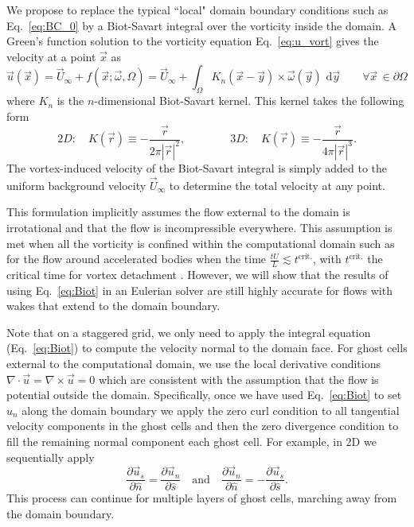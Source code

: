 \documentclass[11pt]{article}
\begin{document}
We propose to replace the typical ``local" domain boundary conditions such as Eq.~\ref{eq:BC_0} by a Biot-Savart integral over the vorticity inside the domain. A Green's function solution to the vorticity equation Eq.~\ref{eq:u_vort} gives the velocity at a point $\vec x$ as
\begin{equation}\label{eq:Biot}
    {\vec u}({\vec x}) = \vec U_\infty+f(\vec x; \vec\omega,\Omega) = \vec U_\infty+\int_\Omega K_{n}({\vec x} - \vec{y})\times \vec\omega({\vec y})\text{ d}\vec{y} \quad\quad \forall \vec x\, \in \partial\Omega
\end{equation}
where $K_n$ is the $n$-dimensional Biot-Savart kernel. This kernel takes the following form \cite{Eldredge2019MathematicalFlows}
\begin{equation}\label{eq:kernels}
    2D:\quad K(\vec r)\equiv -\frac{\vec{r}}{2\pi|\vec{r}|^2}, \qquad\qquad 3D:\quad K(\vec r)\equiv -\frac{\vec{r}}{4\pi|\vec{r}|^3}.
\end{equation}
The vortex-induced velocity of the Biot-Savart integral is simply added to the uniform background velocity $\vec U_\infty$ to determine the total velocity at any point.

This formulation implicitly assumes the flow external to the domain is irrotational and that the flow is incompressible everywhere. This assumption is met when all the vorticity is confined within the computational domain such as for the flow around accelerated bodies when the time $\frac{tU}{L}\lesssim t^{\text{crit.}}$, with $t^{\text{crit.}}$ the critical time for vortex detachment \cite{Shusser2000EnergyRing}. However, we will show that the results of using Eq.~\ref{eq:Biot} in an Eulerian solver are still highly accurate for flows with wakes that extend to the domain boundary. 

Note that on a staggered grid, we only need to apply the integral equation (Eq.~\ref{eq:Biot}) to compute the velocity normal to the domain face. For ghost cells external to the computational domain, we use the local derivative conditions $\nabla\cdot\vec{u} = \nabla\times\vec{u}=0$ which are consistent with the assumption that the flow is potential outside the domain. Specifically, once we have used Eq.~\ref{eq:Biot} to set $u_n$ along the domain boundary we apply the zero curl condition to all tangential velocity components in the ghost cells and then the zero divergence condition to fill the remaining normal component each ghost cell. For example, in 2D we sequentially apply
\[ \frac{\partial \vec{u}_s}{\partial \hat{n}} = \frac{\partial \vec{u}_n}{\partial \hat{s}} \quad \text{and} \quad \frac{\partial \vec{u}_n}{\partial \hat{n}} = -\frac{\partial \vec{u}_s}{\partial \hat{s}}.\]
This process can continue for multiple layers of ghost cells, marching away from the domain boundary.
\end{document}
